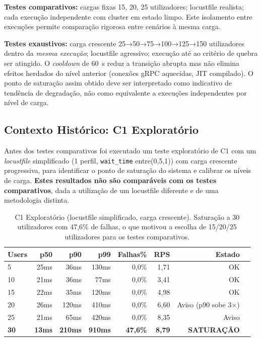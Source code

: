 \documentclass[manuscript,oneside]{acmart}
\begin{document}
\textbf{Testes comparativos:} cargas fixas 15, 20, 25 utilizadores; locustfile realista; cada execução independente com cluster em estado limpo. Este isolamento entre execuções permite comparação rigorosa entre cenários à mesma carga.

\textbf{Testes exaustivos:} carga crescente 25→50→75→100→125→150 utilizadores dentro da \emph{mesma execução}; locustfile agressivo; execução até ao critério de quebra ser atingido. O \textit{cooldown} de 60~s reduz a transição abrupta mas não elimina efeitos herdados do nível anterior (conexões gRPC aquecidas, JIT compilado). O ponto de saturação assim obtido deve ser interpretado como indicativo de tendência de degradação, não como equivalente a execuções independentes por nível de carga.

\subsection{Contexto Histórico: C1 Exploratório}

Antes dos testes comparativos foi executado um teste exploratório de C1 com um \textit{locustfile} simplificado (1 perfil, \texttt{wait\_time} entre(0{,}5,1)) com carga crescente progressiva, para identificar o ponto de saturação do sistema e calibrar os níveis de carga. \textbf{Estes resultados não são comparáveis com os testes comparativos}, dada a utilização de um locustfile diferente e de uma metodologia distinta.

\begin{table}[H]
\caption{C1 Exploratório (locustfile simplificado, carga crescente). Saturação a 30 utilizadores com 47{,}6\% de falhas, o que motivou a escolha de 15/20/25 utilizadores para os testes comparativos.}
\label{tab:c1exp}
\begin{tabular}{lrrrrrrl}
\toprule
\textbf{Users} & \textbf{p50} & \textbf{p90} & \textbf{p99} & \textbf{Falhas\%} & \textbf{RPS} & \textbf{Estado} \\
\midrule
5  & 25ms & 36ms  & 130ms & 0{,}0\% & 1{,}71 & OK \\
10 & 21ms & 36ms  & 77ms  & 0{,}0\% & 3{,}41 & OK \\
15 & 22ms & 35ms  & 120ms & 0{,}0\% & 4{,}98 & OK \\
20 & 26ms & 120ms & 410ms & 0{,}0\% & 6{,}60 & Aviso (p90 sobe 3×) \\
25 & 21ms & 65ms  & 420ms & 0{,}0\% & 8{,}35 & Aviso \\
\textbf{30} & \textbf{13ms} & \textbf{210ms} & \textbf{910ms} & \textbf{47{,}6\%} & \textbf{8{,}79} & \textbf{SATURAÇÃO} \\
\bottomrule
\end{tabular}
\end{table}
\end{document}
